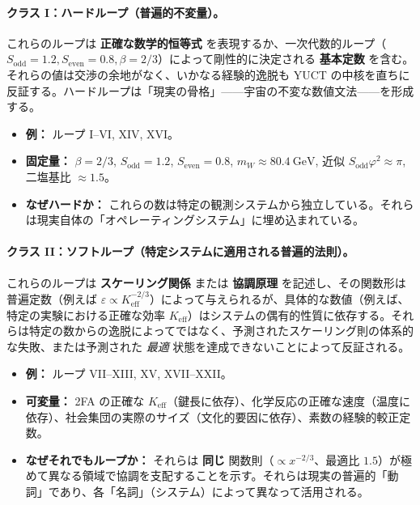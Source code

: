 \documentclass[12pt,a4paper]{article}
\begin{document}
	\paragraph{クラス I：ハードループ（普遍的不変量）。}
	これらのループは \textbf{正確な数学的恒等式} を表現するか、一次代数的ループ（\(S_{\mathrm{odd}}=1.2, S_{\mathrm{even}}=0.8, \beta=2/3\)）によって剛性的に決定される \textbf{基本定数} を含む。それらの値は交渉の余地がなく、いかなる経験的逸脱も YUCT の中核を直ちに反証する。ハードループは「現実の骨格」——宇宙の不変な数値文法——を形成する。
	\begin{itemize}
		\item \textbf{例：} ループ I--VI, XIV, XVI。
		\item \textbf{固定量：} \(\beta = 2/3\), \(S_{\mathrm{odd}}=1.2\), \(S_{\mathrm{even}}=0.8\), \(m_W \approx 80.4\ \text{GeV}\), 近似 \(S_{\mathrm{odd}}\varphi^2 \approx \pi\), 二塩基比 \(\approx 1.5\)。
		\item \textbf{なぜハードか：} これらの数は特定の観測システムから独立している。それらは現実自体の「オペレーティングシステム」に埋め込まれている。
	\end{itemize}
	
	\paragraph{クラス II：ソフトループ（特定システムに適用される普遍的法則）。}
	これらのループは \textbf{スケーリング関係} または \textbf{協調原理} を記述し、その関数形は普遍定数（例えば \(\varepsilon \propto K_{\mathrm{eff}}^{-2/3}\)）によって与えられるが、具体的な数値（例えば、特定の実験における正確な効率 \(K_{\mathrm{eff}}\)）はシステムの偶有的性質に依存する。それらは特定の数からの逸脱によってではなく、予測されたスケーリング則の体系的な失敗、または予測された \textit{最適} 状態を達成できないことによって反証される。
	\begin{itemize}
		\item \textbf{例：} ループ VII--XIII, XV, XVII--XXII。
		\item \textbf{可変量：} 2FA の正確な \(K_{\mathrm{eff}}\)（鍵長に依存）、化学反応の正確な速度（温度に依存）、社会集団の実際のサイズ（文化的要因に依存）、素数の経験的較正定数。
		\item \textbf{なぜそれでもループか：} それらは \textbf{同じ} 関数則（\(\propto x^{-2/3}\)、最適比 \(1.5\)）が極めて異なる領域で協調を支配することを示す。それらは現実の普遍的「動詞」であり、各「名詞」（システム）によって異なって活用される。
	\end{itemize}
	
\end{document}
